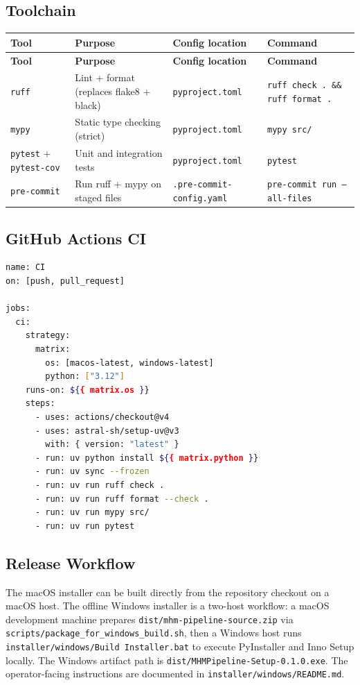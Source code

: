 \documentclass[12pt]{article}
\newcommand{\filepath}[1]{\texttt{\small #1}}
\newcommand{\code}[1]{\texttt{#1}}
\begin{document}
\subsection{Toolchain}

\begin{longtable}{|l|p{3.5cm}|l|l|}
\hline
\textbf{Tool} & \textbf{Purpose} & \textbf{Config location} & \textbf{Command} \\
\hline
\endfirsthead
\hline
\textbf{Tool} & \textbf{Purpose} & \textbf{Config location} & \textbf{Command} \\
\hline
\endhead
\hline
\endfoot
\code{ruff} & Lint + format (replaces flake8 + black) & \code{pyproject.toml} & \code{ruff check . \&\& ruff format .} \\
\hline
\code{mypy} & Static type checking (strict) & \code{pyproject.toml} & \code{mypy src/} \\
\hline
\code{pytest} + \code{pytest-cov} & Unit and integration tests & \code{pyproject.toml} & \code{pytest} \\
\hline
\code{pre-commit} & Run ruff + mypy on staged files & \code{.pre-commit-config.yaml} & \code{pre-commit run --all-files} \\
\hline
\end{longtable}

\subsection{GitHub Actions CI}

\begin{lstlisting}[language=bash, caption={.github/workflows/ci.yml --- lint, typecheck, and test matrix}]
name: CI
on: [push, pull_request]

jobs:
  ci:
    strategy:
      matrix:
        os: [macos-latest, windows-latest]
        python: ["3.12"]
    runs-on: ${{ matrix.os }}
    steps:
      - uses: actions/checkout@v4
      - uses: astral-sh/setup-uv@v3
        with: { version: "latest" }
      - run: uv python install ${{ matrix.python }}
      - run: uv sync --frozen
      - run: uv run ruff check .
      - run: uv run ruff format --check .
      - run: uv run mypy src/
      - run: uv run pytest
\end{lstlisting}

\subsection{Release Workflow}

The macOS installer can be built directly from the repository checkout on a macOS host. The offline Windows installer is a two-host workflow: a macOS development machine prepares \filepath{dist/mhm-pipeline-source.zip} via \filepath{scripts/package\_for\_windows\_build.sh}, then a Windows host runs \filepath{installer/windows/Build Installer.bat} to execute PyInstaller and Inno Setup locally. The Windows artifact path is \filepath{dist/MHMPipeline-Setup-0.1.0.exe}. The operator-facing instructions are documented in \filepath{installer/windows/README.md}.
\end{document}
